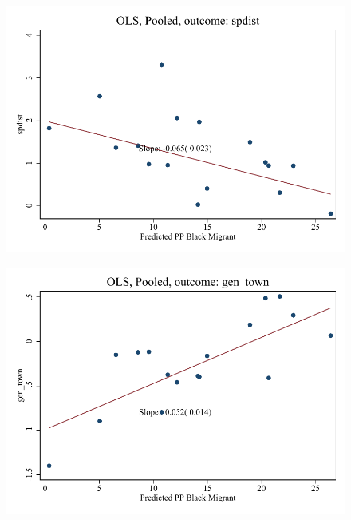 \documentclass{article}
\begin{document}
\clearpage
\begin{figure}
	\centering
	\includegraphics[width=.8\textwidth]{figures/binscatter/pooled_spdist_ols.pdf}
\end{figure}
\clearpage
\begin{figure}
	\centering
	\includegraphics[width=.8\textwidth]{figures/binscatter/pooled_gen_town_ols.pdf}
\end{figure}
\clearpage
\end{document}
